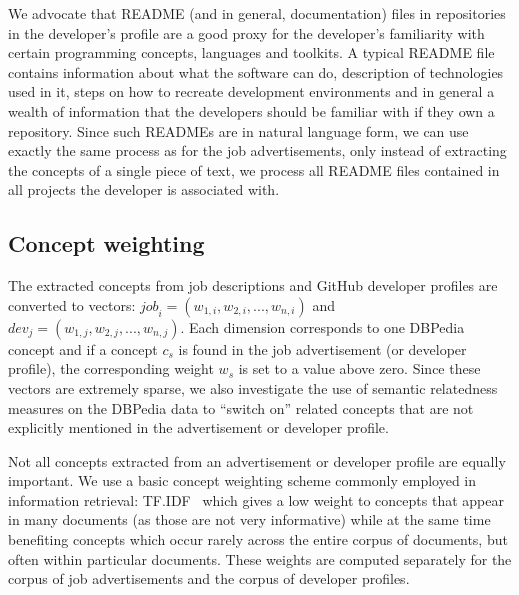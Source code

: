 \documentclass[conference]{IEEEtran}
\begin{document}
We advocate that README (and in general, documentation) files in repositories in
the developer's profile are a good proxy for the developer's familiarity with
certain programming concepts, languages and toolkits. A typical README file
contains information about what the software can do, description of technologies
used in it, steps on how to recreate development environments and in general a
wealth of information that the developers should be familiar with if they own a
repository. Since such READMEs are in natural language form, we can use exactly
the same process as for the job advertisements, only instead of extracting the
concepts of a single piece of text, we process all README files contained in all
projects the developer is associated with. 

\subsection{Concept weighting}

The extracted concepts from job descriptions and GitHub developer profiles are converted
to vectors: $\textit{job}_i=(w_{1,i}, w_{2,i}, ..., w_{n,i})$ and $\textit{dev}_j=(w_{1,j},
w_{2,j}, ..., w_{n,j})$. Each dimension corresponds to one DBPedia concept and
if a concept $c_s$ is found in the job advertisement (or developer profile), the
corresponding weight $w_{s}$ is set to a value above zero. Since these vectors
are extremely sparse, we also investigate the use of semantic relatedness measures on the DBPedia data to ``switch on'' related concepts that are not explicitly mentioned in the
advertisement or developer profile.

Not all concepts extracted from an advertisement or developer profile are
equally important. We use a basic concept weighting scheme commonly employed in information retrieval: TF.IDF~\cite{baeza1999modern} which gives a low weight to concepts that appear in many documents (as those are not very informative) while at the same time benefiting concepts which occur rarely across the entire corpus of documents, but often within particular documents. These weights are computed separately for the corpus of job advertisements and the corpus of developer profiles. 

\end{document}
